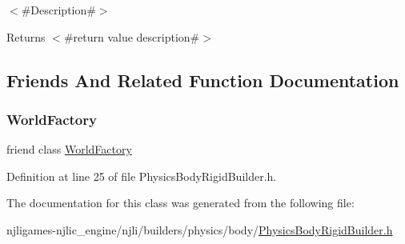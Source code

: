 $<$\#\+Description\#$>$

\begin{DoxyReturn}{Returns}
$<$\#return value description\#$>$ 
\end{DoxyReturn}


\subsection{Friends And Related Function Documentation}
\mbox{\label{classnjli_1_1_physics_body_rigid_builder_acb96ebb09abe8f2a37a915a842babfac}} 
\subsubsection{\texorpdfstring{World\+Factory}{WorldFactory}}
{\footnotesize\ttfamily friend class \mbox{\hyperlink{classnjli_1_1_world_factory}{World\+Factory}}\hspace{0.3cm}{\ttfamily [friend]}}



Definition at line 25 of file Physics\+Body\+Rigid\+Builder.\+h.



The documentation for this class was generated from the following file\+:\begin{DoxyCompactItemize}
\item 
njligames-\/njlic\+\_\+engine/njli/builders/physics/body/\mbox{\hyperlink{_physics_body_rigid_builder_8h}{Physics\+Body\+Rigid\+Builder.\+h}}\end{DoxyCompactItemize}
